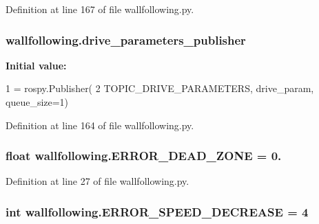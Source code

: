 Definition at line 167 of file wallfollowing.\+py.

\subsubsection[{\texorpdfstring{drive\+\_\+parameters\+\_\+publisher}{drive_parameters_publisher}}]{\setlength{\rightskip}{0pt plus 5cm}wallfollowing.\+drive\+\_\+parameters\+\_\+publisher}\hypertarget{namespacewallfollowing_aa69138defbbc5f21e99db50a6b3c903f}{}\label{namespacewallfollowing_aa69138defbbc5f21e99db50a6b3c903f}
{\bfseries Initial value\+:}
\begin{DoxyCode}
1 = rospy.Publisher(
2     TOPIC\_DRIVE\_PARAMETERS, drive\_param, queue\_size=1)
\end{DoxyCode}


Definition at line 164 of file wallfollowing.\+py.

\subsubsection[{\texorpdfstring{E\+R\+R\+O\+R\+\_\+\+D\+E\+A\+D\+\_\+\+Z\+O\+NE}{ERROR_DEAD_ZONE}}]{\setlength{\rightskip}{0pt plus 5cm}float wallfollowing.\+E\+R\+R\+O\+R\+\_\+\+D\+E\+A\+D\+\_\+\+Z\+O\+NE = 0.}\hypertarget{namespacewallfollowing_ac87d5f143cfd44f170a1d385ebd1a71b}{}\label{namespacewallfollowing_ac87d5f143cfd44f170a1d385ebd1a71b}


Definition at line 27 of file wallfollowing.\+py.

\subsubsection[{\texorpdfstring{E\+R\+R\+O\+R\+\_\+\+S\+P\+E\+E\+D\+\_\+\+D\+E\+C\+R\+E\+A\+SE}{ERROR_SPEED_DECREASE}}]{\setlength{\rightskip}{0pt plus 5cm}int wallfollowing.\+E\+R\+R\+O\+R\+\_\+\+S\+P\+E\+E\+D\+\_\+\+D\+E\+C\+R\+E\+A\+SE = 4}\hypertarget{namespacewallfollowing_a205d8fd2e51cc16818cb679f6c87c861}{}\label{namespacewallfollowing_a205d8fd2e51cc16818cb679f6c87c861}


